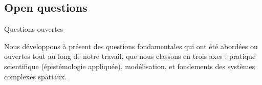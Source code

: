 





\subsection*{Open questions}{Questions ouvertes}


Nous développons à présent des questions fondamentales qui ont été abordées ou ouvertes tout au long de notre travail, que nous classons en trois axes : pratique scientifique (épistémologie appliquée), modélisation, et fondements des systèmes complexes spatiaux.


